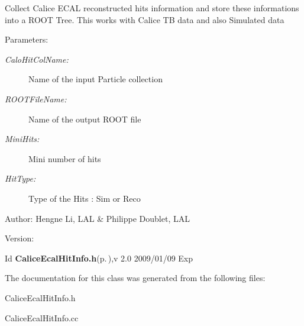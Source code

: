 Collect Calice ECAL reconstructed hits information and store these informations into a ROOT Tree. This works with Calice TB data and also Simulated data

\begin{Desc}
\item[Parameters:]
\begin{description}
\item[{\em Calo\-Hit\-Col\-Name:}]Name of the input Particle collection \item[{\em ROOTFile\-Name:}]Name of the output ROOT file \item[{\em Mini\-Hits:}]Mini number of hits \item[{\em Hit\-Type:}]Type of the Hits : Sim or Reco\end{description}
\end{Desc}
\begin{Desc}
\item[Author:]Hengne Li, LAL \& Philippe Doublet, LAL \end{Desc}
\begin{Desc}
\item[Version:]\begin{Desc}
\item[Id]{\bf Calice\-Ecal\-Hit\-Info.h}{\rm (p.\,\pageref{CaliceEcalHitInfo_8h})},v 2.0 2009/01/09 Exp \end{Desc}
\end{Desc}




The documentation for this class was generated from the following files:\begin{CompactItemize}
\item 
Calice\-Ecal\-Hit\-Info.h\item 
Calice\-Ecal\-Hit\-Info.cc\end{CompactItemize}
